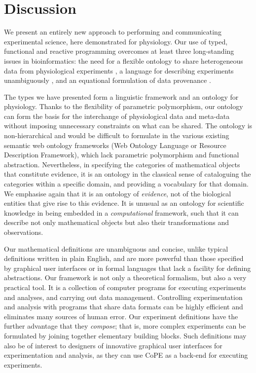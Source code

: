 \section*{Discussion}

We present an entirely new approach to performing and communicating
experimental science, here demonstrated for physiology.  Our use of
typed, functional and reactive programming overcomes at least three
long-standing issues in bioinformatics: the need for a flexible
ontology to share heterogeneous data from physiological experiments
\cite{Amari2002}, a language for describing experiments unambiguously
\cite{Murray-Rust2002}, and an equational formulation of data
provenance \cite{Pool2002}.

The types we have presented form a linguistic framework and an
ontology for physiology. Thanks to the flexibility of parametric polymorphism,
our ontology can form the basis for the interchange of physiological data
and meta-data without imposing unnecessary constraints on what can be
shared. The ontology is non-hierarchical and would be difficult to
formulate in the various existing semantic web ontology frameworks
(Web Ontology Language or Resource Description Framework), which lack
parametric polymorphism and functional abstraction. Nevertheless, in
specifying the categories of mathematical objects that constitute
evidence, it is an ontology in the classical sense of cataloguing the
categories within a specific domain, and providing a vocabulary for
that domain. We emphasise again that it is an ontology of
\emph{evidence}, not of the biological entities that give rise to this
evidence. It is unusual as an ontology for scientific knowledge in
being embedded in a \emph{computational} framework, such that it can
describe not only mathematical objects but also their transformations
and observations.

%
% 
%
Our mathematical definitions are unambiguous and concise, unlike
typical definitions written in plain English,
and are more powerful than those specified
by graphical user interfaces or in formal languages that lack a
facility for defining abstractions. Our framework is not only a
theoretical formalism, but also a very practical tool. It is a
collection of computer programs for executing experiments and
analyses, and carrying out data management. Controlling
experimentation and analysis with programs that share data formats can
be highly efficient and eliminates many sources of human error. Our
experiment definitions have the further advantage that they
\emph{compose}; that is, more complex experiments can be formulated by
joining together elementary building blocks. Such definitions may also
be of interest to designers of innovative graphical user interfaces
for experimentation and analysis, as they can use CoPE as a back-end
for executing experiments.

